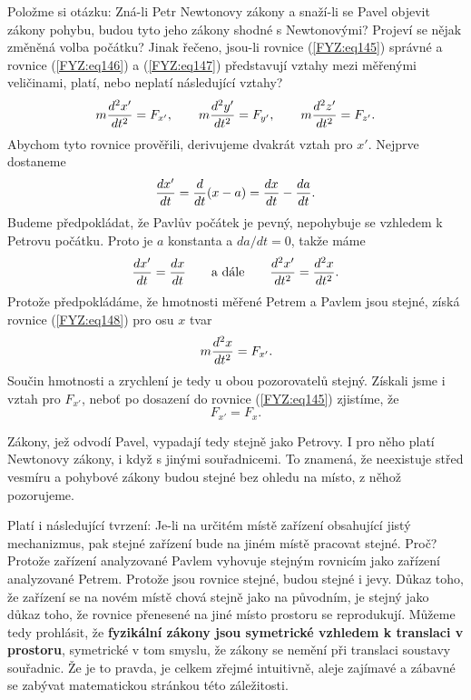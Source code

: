 {    Položme si otázku: Zná-li Petr Newtonovy zákony a snaží-li se Pavel objevit zákony pohybu, 
    budou tyto jeho zákony shodné s Newtonovými? Projeví se nějak změněná volba počátku? Jinak 
    řečeno, jsou-li rovnice (\ref{FYZ:eq145}) správné a rovnice (\ref{FYZ:eq146}) a 
    (\ref{FYZ:eq147}) představují vztahy mezi měřenými veličinami, platí, nebo neplatí následující 
    vztahy?
    \begin{equation}\label{FYZ:eq148}
      m\frac{d^2 x'}{d t^2} = F_{x'}, \qquad
      m\frac{d^2 y'}{d t^2} = F_{y'}, \qquad
      m\frac{d^2 z'}{d t^2} = F_{z'}.
    \end{equation}
    Abychom tyto rovnice prověřili, derivujeme dvakrát vztah pro \(x'\). Nejprve dostaneme
    \begin{equation*}
      \frac{d x'}{d t} =\frac{d  }{d t}(x-a) = \frac{d x}{d t} - \frac{d a}{d t}.
    \end{equation*}
    Budeme předpokládat, že Pavlův počátek je pevný, nepohybuje se vzhledem k Petrovu počátku. 
    Proto je \(a\) konstanta a \(da/dt=0\), takže máme
    \begin{equation*}
      \frac{d x'}{d t} = \frac{d x}{d t} \qquad\text{a dále}\qquad \frac{d^2 x'}{d t^2} = \frac{d^2 x}{d t^2}.
    \end{equation*}
    Protože předpokládáme, že hmotnosti měřené Petrem a Pavlem jsou stejné, získá rovnice 
    (\ref{FYZ:eq148}) pro osu \(x\) tvar
    \begin{equation*}
      m\frac{d^2 x}{d t^2} = F_{x'}.
    \end{equation*}
    Součin hmotnosti a zrychlení je tedy u obou pozorovatelů stejný. Získali jsme i vztah pro 
    \(F_{x'}\), neboť po dosazení do rovnice (\ref{FYZ:eq145}) zjistíme, že
    \begin{equation*}
      F_{x'} = F_{x}.
    \end{equation*}
    
    Zákony, jež odvodí Pavel, vypadají tedy stejně jako Petrovy. I pro něho platí Newtonovy zákony, 
    i když s jinými souřadnicemi. To znamená, že neexistuje střed vesmíru a pohybové zákony budou 
    stejné bez ohledu na místo, z něhož pozorujeme.
    
    Platí i následující tvrzení: Je-li na určitém místě zařízení obsahující jistý mechanizmus, pak 
    stejné zařízení bude na jiném místě pracovat stejné. Proč? Protože zařízení analyzované Pavlem 
    vyhovuje stejným rovnicím jako zařízení analyzované Petrem. Protože jsou rovnice stejné, budou 
    stejné i jevy. Důkaz toho, že zařízení se na novém místě chová stejně jako na původním, je 
    stejný jako důkaz toho, že rovnice přenesené na jiné místo prostoru se reprodukují. Můžeme tedy 
    prohlásit, že \textbf{fyzikální zákony jsou symetrické vzhledem k translaci v prostoru}, 
    symetrické v tom smyslu, že zákony se nemění při translaci soustavy souřadnic. Že je to pravda, 
    je celkem zřejmé intuitivně, aleje zajímavé a zábavné se zabývat matematickou stránkou této 
    záležitosti.
    
}
